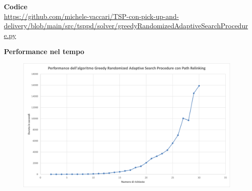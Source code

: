 \documentclass[9pt]{beamer}
\begin{document}
\begin{frame}[allowframebreaks]{\subsecname}
	\textbf{Codice} \\
	\href{https://github.com/michele-vaccari/TSP-con-pick-up-and-delivery/blob/main/src/tsppd/solver/greedyRandomizedAdaptiveSearchProcedure.py}{https://github.com/michele-vaccari/TSP-con-pick-up-and-delivery/blob/main/src/tsppd/solver/greedyRandomizedAdaptiveSearchProcedure.py}

\framebreak

	\textbf{Performance nel tempo}
      	\begin{figure}[h]
	\centering
	\includegraphics[width=\textwidth]
	{../charts/16 Performance dell'algoritmo Greedy Randomized Adaptive Search Procedure con Path Relinking}
	\end{figure}

\end{frame}
\end{document}

